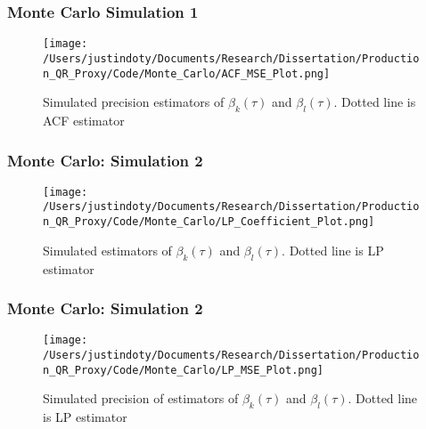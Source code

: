 \documentclass{beamer}
\begin{document}
\begin{frame}
\frametitle{Monte Carlo Simulation 1}
\begin{figure}[H]
\centering
\caption{Simulated precision estimators of $\beta_{k}(\tau)$ and $\beta_{l}(\tau)$. Dotted line is ACF estimator}
\texttt{[image: /Users/justindoty/Documents/Research/Dissertation/Production\_QR\_Proxy/Code/Monte\_Carlo/ACF\_MSE\_Plot.png]}
\end{figure}
\end{frame}

\begin{frame}
\frametitle{Monte Carlo: Simulation 2}
\begin{figure}[H]
\centering
\caption{Simulated estimators of $\beta_{k}(\tau)$ and $\beta_{l}(\tau)$. Dotted line is LP estimator}
\texttt{[image: /Users/justindoty/Documents/Research/Dissertation/Production\_QR\_Proxy/Code/Monte\_Carlo/LP\_Coefficient\_Plot.png]}
\end{figure}
\end{frame}



\begin{frame}
\frametitle{Monte Carlo: Simulation 2}
\begin{figure}[H]
\centering
\caption{Simulated precision of estimators of $\beta_{k}(\tau)$ and $\beta_{l}(\tau)$. Dotted line is LP estimator}
\texttt{[image: /Users/justindoty/Documents/Research/Dissertation/Production\_QR\_Proxy/Code/Monte\_Carlo/LP\_MSE\_Plot.png]}
\end{figure}
\end{frame}

\end{document}
